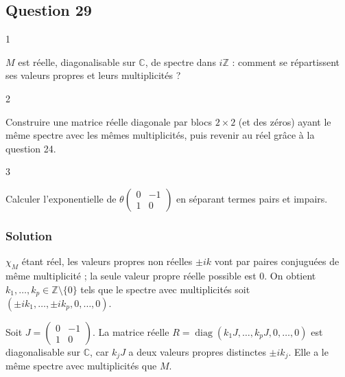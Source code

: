 \documentclass[11pt,a4paper]{article}
\begin{document}
\hypertarget{question-29}{%
\subsection{Question 29}\label{question-29}}

\begin{indication}{1}

\(M\) est réelle, diagonalisable sur \(\mathbb{C}\), de spectre dans \(i\mathbb{Z}\) : comment se répartissent ses valeurs propres et leurs multiplicités ?

\end{indication}

\begin{indication}{2}

Construire une matrice réelle diagonale par blocs \(2\times2\) (et des zéros) ayant le même spectre avec les mêmes multiplicités, puis revenir au réel grâce à la question 24.

\end{indication}

\begin{indication}{3}

Calculer l'exponentielle de \(\theta\begin{pmatrix}0&-1\\1&0\end{pmatrix}\) en séparant termes pairs et impairs.

\end{indication}

\hypertarget{solution-28}{%
\subsubsection{Solution}\label{solution-28}}

\(\chi_M\) étant réel, les valeurs propres non réelles \(\pm ik\) vont par paires conjuguées de même multiplicité ; la seule valeur propre réelle possible est \(0\). On obtient \(k_1,\dots,k_p\in\mathbb{Z}\setminus\{0\}\) tels que le spectre avec multiplicités soit \((\pm ik_1,\dots,\pm ik_p,0,\dots,0)\).

Soit \(J=\begin{pmatrix}0&-1\\1&0\end{pmatrix}\). La matrice réelle \(R=\operatorname{diag}(k_1J,\dots,k_pJ,0,\dots,0)\) est diagonalisable sur \(\mathbb{C}\), car \(k_jJ\) a deux valeurs propres distinctes \(\pm ik_j\). Elle a le même spectre avec multiplicités que \(M\).
\end{document}
